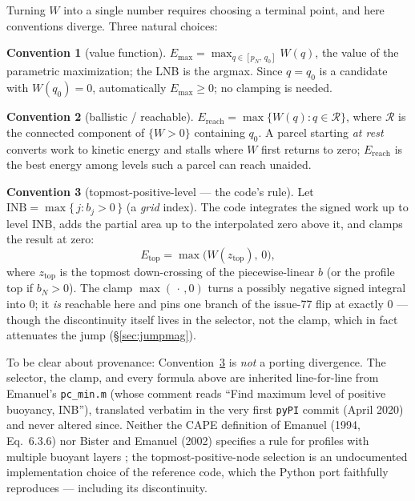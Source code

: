 \documentclass[11pt,a4paper]{article}
\theoremstyle{definition}
\newtheorem{convention}{Convention}
\newcommand{\Etop}{E_{\mathrm{top}}}
\newcommand{\Emax}{E_{\mathrm{max}}}
\newcommand{\Ereach}{E_{\mathrm{reach}}}
\begin{document}
Turning $W$ into a single number requires choosing a terminal point, and
here conventions diverge.  Three natural choices:

\begin{convention}[value function]\label{conv:max}
$\displaystyle \Emax=\max_{q\in[p_N,\,q_0]} W(q)$, the value of the
parametric maximization; the LNB is the argmax.  Since $q=q_0$ is a
candidate with $W(q_0)=0$, automatically $\Emax\ge0$; no clamping is needed.
\end{convention}

\begin{convention}[ballistic / reachable]\label{conv:reach}
$\Ereach=\max\{W(q):q\in\mathcal R\}$, where $\mathcal R$ is the
connected component of $\{W>0\}$ containing $q_0$.  A parcel starting
\emph{at rest} converts work
to kinetic energy and stalls where $W$ first returns to zero; $\Ereach$ is
the best energy among levels such a parcel can reach unaided.
\end{convention}

\begin{convention}[topmost-positive-level --- the code's rule]\label{conv:top}
Let $\mathrm{INB}=\max\{\,j : b_j>0\,\}$ (a \emph{grid} index).  The
code integrates the signed work up to level $\mathrm{INB}$, adds the
partial area up to the interpolated zero above it, and clamps the result at
zero:
\[
\Etop=\max\bigl(W(z_{\mathrm{top}}),\,0\bigr),
\]
where $z_{\mathrm{top}}$ is the topmost down-crossing of the
piecewise-linear $b$ (or the profile top if $b_N>0$).  The clamp
$\max(\,\cdot\,,0)$ turns a possibly negative signed integral into $0$; it
\emph{is} reachable here and pins one branch of the issue-77 flip at
exactly $0$ --- though the discontinuity itself lives in the selector, not
the clamp, which in fact attenuates the jump (\S\ref{sec:jumpmag}).
\end{convention}

To be clear about provenance: Convention~\ref{conv:top} is \emph{not} a
porting divergence.  The selector, the clamp, and every formula above are
inherited line-for-line from Emanuel's \texttt{pc\_min.m} (whose comment
reads ``Find maximum level of positive buoyancy, INB''), translated
verbatim in the very first \texttt{pyPI} commit (April 2020) and never
altered since.  Neither the CAPE definition of Emanuel (1994,
Eq.~6.3.6) nor Bister and Emanuel (2002) specifies a rule for profiles
with multiple buoyant layers \cite{emanuel1994,bisteremanuel2002}; the
topmost-positive-node selection is an undocumented implementation choice
of the reference code, which the Python port faithfully reproduces ---
including its discontinuity.
\end{document}
